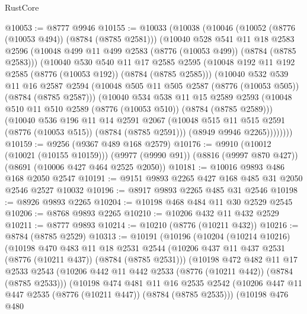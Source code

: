 \begin{lexlean}{RustCore}
\begin{coremodule}
@10053 := @8777 @9946
@10155 := @10033
    (@10038
      (@10046
        (@10052 (@8776 (@10053 @494)) (@8784 (@8785 @2581)))
        (@10040
          @528
          @541
          @11
          @18
          @2583
          @2596
          (@10048 @499 @11 @499 @2583 (@8776 (@10053 @499)) (@8784 (@8785 @2583)))
          (@10040
            @530
            @540
            @11
            @17
            @2585
            @2595
            (@10048 @192 @11 @192 @2585 (@8776 (@10053 @192)) (@8784 (@8785 @2585)))
            (@10040
              @532
              @539
              @11
              @16
              @2587
              @2594
              (@10048 @505 @11 @505 @2587 (@8776 (@10053 @505)) (@8784 (@8785 @2587)))
              (@10040
                @534
                @538
                @11
                @15
                @2589
                @2593
                (@10048 @510 @11 @510 @2589 (@8776 (@10053 @510)) (@8784 (@8785 @2589)))
                (@10040
                  @536
                  @196
                  @11
                  @14
                  @2591
                  @2067
                  (@10048 @515 @11 @515 @2591 (@8776 (@10053 @515)) (@8784 (@8785 @2591)))
                  (@8949 @9946 @2265))))))))
@10159 := @9256 (@9367 @489 @168 @2579)
@10176 := @9910
    (@10012 (@10021 (@10155 @10159)))
    (@9977 (@9990 @91))
    (@8816 (@9997 @870 @427))
    (@8691 (@10006 @427 @464 @2525 @2050))
@10181 := @10016 @9893 @486 @168 @2050 @2547
@10191 := @9151 @9893 @2265 @427 @168 @485 @31 @2050 @2546 @2527 @10032
@10196 := @8917 @9893 @2265 @485 @31 @2546
@10198 := @8926 @9893 @2265
@10204 := @10198 @468 @484 @11 @30 @2529 @2545
@10206 := @8768 @9893 @2265
@10210 := @10206 @432 @11 @432 @2529
@10211 := @8777 @9893
@10214 := @10210 (@8776 (@10211 @432))
@10216 := @8784 (@8785 @2529)
@10313 := @10191
    (@10196
      (@10204
        (@10214 @10216)
        (@10198
          @470
          @483
          @11
          @18
          @2531
          @2544
          (@10206 @437 @11 @437 @2531 (@8776 (@10211 @437)) (@8784 (@8785 @2531)))
          (@10198
            @472
            @482
            @11
            @17
            @2533
            @2543
            (@10206 @442 @11 @442 @2533 (@8776 (@10211 @442)) (@8784 (@8785 @2533)))
            (@10198
              @474
              @481
              @11
              @16
              @2535
              @2542
              (@10206 @447 @11 @447 @2535 (@8776 (@10211 @447)) (@8784 (@8785 @2535)))
              (@10198
                @476
                @480

\end{coremodule}
\end{lexlean}
